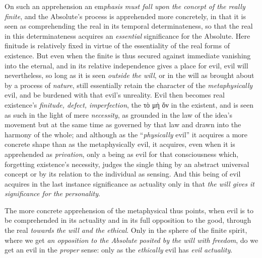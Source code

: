 \documentclass[12pt,a4paper]{book}
\begin{document}
On such an apprehension an em\emph{phasis must fall upon the concept of the
really finite}, and the Absolute's process is apprehended more concretely, in
that it is seen as comprehending the real in its temporal determinateness, so
that the real in this determinateness acquires an \emph{essential} significance
for the Absolute. Here finitude is relatively fixed in virtue of the
essentiality of the real forms of existence. But even when the finite is thus
secured against immediate vanishing into the eternal, and in its relative
independence gives a place for evil, evil will nevertheless, so long as it is
seen \emph{outside}
\emph{the will}, or in the will as brought about by a process of
\emph{nature}, still essentially retain the character of the
\emph{metaphysically} evil, and be burdened with that evil's unreality. Evil
then becomes real existence's \emph{finitude, defect, imperfection}, the
τὸ μὴ ὄν in the existent, and is seen as such in the light of mere
\emph{necessity}, as grounded in the law of the idea's movement but at the same
time as governed by that law and drawn into the harmony of the whole; and
although as the ``\emph{physically} evil'' it acquires a more concrete shape
than as the metaphysically evil, it acquires, even when it is apprehended as
\emph{privation}, only a being as evil for that consciousness which, forgetting
existence's necessity, judges the single thing by an abstract universal concept
or by its relation to the individual as sensing. And this being of evil
acquires in the last instance significance as actuality only in that \emph{the
will gives it significance for the personality}.

The more concrete apprehension of the metaphysical thus points, when evil is to
be comprehended in its actuality and in its full opposition to the good,
through the real \emph{towards the will and the ethical}. Only in the sphere of
the finite spirit, where we get \emph{an opposition to the Absolute posited by
the will with freedom}, do we get an evil in the \emph{proper} sense: only as
the \emph{ethically} evil has \emph{evil actuality}.
\end{document}
